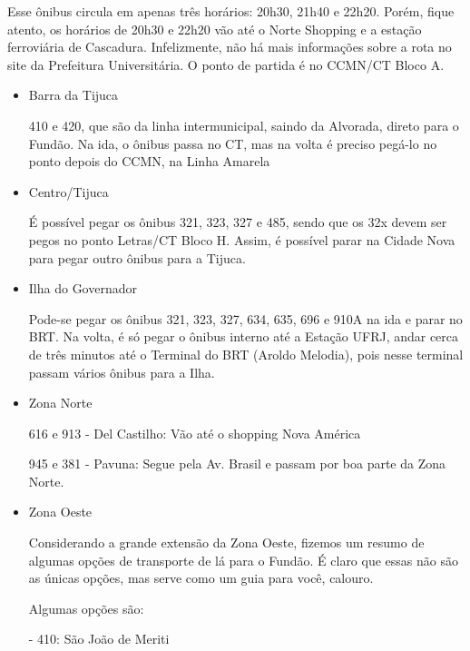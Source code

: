 	Esse ônibus circula em apenas três horários: 20h30, 21h40 e 22h20. Porém, fique atento, os horários de 20h30 e 22h20 vão até o Norte Shopping e a estação ferroviária de Cascadura. Infelizmente, não há mais informações sobre a rota no site da Prefeitura Universitária. O ponto de partida é no CCMN/CT Bloco A.
    
    \begin{itemize}    	            
        \item Barra da Tijuca
        
        	410 e 420, que são da linha intermunicipal, saindo da Alvorada, direto para o Fundão. Na ida, o ônibus passa no CT, mas na volta é preciso pegá-lo no ponto depois do CCMN, na Linha Amarela
            
        \item Centro/Tijuca
        
        	É possível pegar os ônibus 321, 323, 327 e 485, sendo que os 32x devem ser pegos no ponto Letras/CT Bloco H. Assim, é possível parar na Cidade Nova para pegar outro ônibus para a Tijuca.
            
        \item Ilha do Governador
        
        	Pode-se pegar os ônibus 321, 323, 327, 634, 635, 696 e 910A na ida e parar no BRT. Na volta, é só pegar o ônibus interno até a Estação UFRJ, andar cerca de três minutos até o Terminal do BRT (Aroldo Melodia), pois nesse terminal passam vários ônibus para a Ilha.
            
        \item Zona Norte
        
        616 e 913 - Del Castilho: Vão até o shopping Nova América
        
        945 e 381 - Pavuna: Segue pela Av. Brasil e passam por boa parte da Zona Norte.
        
        \item Zona Oeste
        
        Considerando a grande extensão da Zona Oeste, fizemos um resumo de algumas opções de transporte de lá para o Fundão. É claro que essas não são as únicas opções, mas serve como um guia para você, calouro.
        
        Algumas opções são:
        
        - 410: São João de Meriti
            

\end{itemize}
